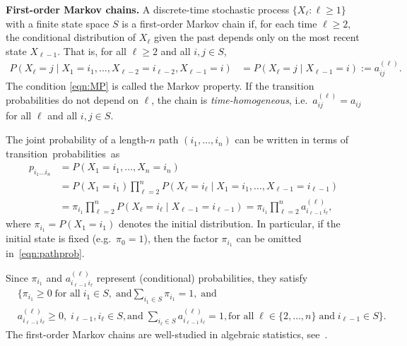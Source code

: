\documentclass[11pt, a4paper]{article}
\numberwithin{equation}{section}
\theoremstyle{plain}
\theoremstyle{definition}
\renewcommand{\emph}[1]{\textit{#1}}
\begin{document}
\medskip
\noindent \textbf{First-order Markov chains.}
A discrete-time stochastic process $\{X_{\ell} : \ell \ge 1\}$ with a finite state space $S$ is a first-order  Markov chain if, for each time $\ell\ge 2$, the conditional distribution of $X_{\ell}$ given the past depends only on the most recent state $X_{\ell-1}$. That is, for all $\ell \ge 2$ and all $i,j \in S$,
\begin{align}
P(X_\ell = j \mid X_1 = i_1, \dots, X_{\ell-2} = i_{\ell-2}, X_{\ell-1} = i)
&= P(X_\ell = j \mid X_{\ell-1} = i)
:= a_{ij}^{(\ell)}. \label{eqn:MP}
\end{align}
The condition \eqref{eqn:MP} is called the Markov property. If the transition probabilities do not depend on $\ell$, the chain is \emph{time-homogeneous}, i.e.\ $a_{ij}^{(\ell)}=a_{ij}$ for all $\ell$ and all $i,j\in S$.

\medskip
\noindent The joint probability of a length-$n$ path $(i_1,\ldots,i_n)$ can be written in terms of transition~probabilities~as
\begin{align}
p_{i_1 \ldots i_n}
&= P(X_1=i_1,\ldots,X_n=i_n) \nonumber\\
&=  P(X_1=i_1) \prod_{\ell=2}^n P(X_{\ell}=i_{\ell} \mid X_1=i_1,\ldots,X_{\ell-1}=i_{\ell-1}) \nonumber\\
&= \pi_{i_1}\prod_{\ell=2}^n P(X_{\ell}=i_{\ell} \mid X_{\ell-1}=i_{\ell-1})
= \pi_{i_1}\prod_{\ell=2}^n a_{i_{\ell-1}\, i_{\ell}}^{(\ell)}, \label{eqn:pathprob}
\end{align}
where $\pi_{i_1}=P(X_1=i_1)$ denotes the initial distribution. In particular, if the initial state is fixed (e.g.\ $\pi_0=1$), then the factor $\pi_{i_1}$ can be omitted in~\eqref{eqn:pathprob}.

Since $\pi_{i_1}$ and $a_{i_{\ell-1}\, i_{\ell}}^{(\ell)}$ represent (conditional) probabilities, they satisfy 
\begin{align*}
& \biggl\{ \pi_{i_1}  \geq 0 \; \text{for all} \;  i_1 \in S, \;  \text{and} 
\sum_{i_1 \in S} \pi_{i_1}=1, \; \text{and} \\ 
& a_{i_{\ell-1}\, i_{\ell}}^{(\ell)}  \geq 0, \; i_{\ell-1},i_{\ell} \in S, \text{and} \; \sum_{i_{\ell} \in S} a_{i_{\ell-1}\, i_{\ell}}^{(\ell)}=1,
\text{for all} \; \ell \in \{2,\ldots,n\}\;  \text{and} \; 
  i_{\ell-1} \in S \biggr\}.
\end{align*}
The first-order Markov chains are well-studied in algebraic statistics, see~\cite[Section 1.1]{sullivant2023algebraic}.
\end{document}
